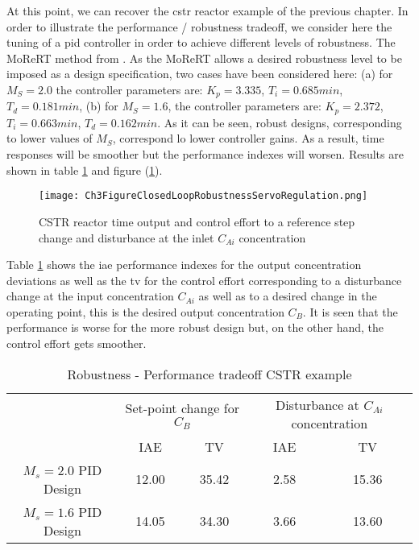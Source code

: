 At this point, we can recover the \gls{cstr} reactor example of the previous chapter. In order to illustrate the performance / robustness tradeoff, we consider here the tuning of a \gls{pid} controller in order to achieve different levels of robustness. The MoReRT method from \cite{Alfaro2016}. As the MoReRT allows a desired robustness level to be imposed as a design specification, two cases have been considered here: (a) for $M_S=2.0$ the controller parameters are: $K_p=3.335$, $T_i =0.685 min$, $T_d=0.181 min$, (b) for $M_S=1.6$, the controller parameters are: $K_p=2.372$, $T_i=0.663 min$, $T_d=0.162 min$. As it can be seen, robust designs, corresponding to lower values of $M_S$, correspond lo lower controller gains. As a result, time responses will be smoother but the performance indexes will worsen. Results are shown in table \ref{tab:cstrtradeoff} and figure (\ref{ch3:fig:Ch3FigureClosedLoopRobustnessServoRegulation}). 
%
\begin{figure}[tb]
    \begin{center}
        \texttt{[image: Ch3FigureClosedLoopRobustnessServoRegulation.png]}
        \caption{CSTR reactor time output and control effort to a reference step change and disturbance at the inlet $C_{Ai}$ concentration }
        \label{ch3:fig:Ch3FigureClosedLoopRobustnessServoRegulation}
    \end{center}
\end{figure}

Table \ref{tab:cstrtradeoff} shows the \gls{iae} performance indexes for the output concentration deviations as well as the \gls{tv} for the control effort corresponding to a disturbance change at the input concentration $C_{Ai}$ as well as to a desired change in the operating point, this is the desired output concentration $C_B$. It is seen that the performance is worse for the more robust design but, on the other hand, the control effort gets smoother. 
\begin{table}[tb]
	\caption{Robustness - Performance tradeoff CSTR example} \label{tab:cstrtradeoff}
	\centering
    \begin{tabular}{ccccc}
    \toprule
    	 & \multicolumn{2}{c}{Set-point change for $C_B$}  & \multicolumn{2}{c}{Disturbance at $C_{Ai}$ concentration}\\
   		 & IAE & TV & IAE & TV\\
    \midrule
    $M_s=2.0$ PID Design   & 12.00 & 35.42 & 2.58 & 15.36 \\
    $M_s=1.6$ PID Design   & 14.05 & 34.30 & 3.66 & 13.60 \\
    \bottomrule
    \end{tabular}
\end{table}
%
